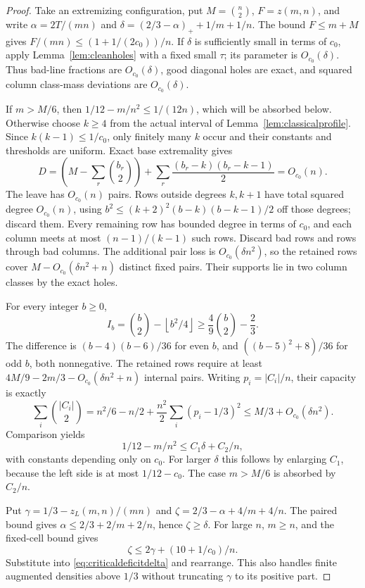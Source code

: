 \documentclass[11pt]{article}
\newcommand{\zl}{z_L}
\begin{document}
\begin{proof}
Take an extremizing configuration, put $M=\binom n2$, $F=z(m,n)$, and
write $\alpha=2T/(mn)$ and $\delta=(2/3-\alpha)_++1/m+1/n$.
The bound $F\le m+M$ gives
$F/(mn)\le(1+1/(2c_0))/n$. If $\delta$ is sufficiently small in terms
of $c_0$, apply Lemma~\ref{lem:cleanholes} with a fixed small $\tau$;
its parameter is $O_{c_0}(\delta)$. Thus bad-line fractions are
$O_{c_0}(\delta)$, good diagonal holes are exact, and squared column
class-mass deviations are $O_{c_0}(\delta)$.

If $m>M/6$, then $1/12-m/n^2\le1/(12n)$, which will be absorbed below.
Otherwise choose $k\ge4$ from the actual interval of
Lemma~\ref{lem:classicalprofile}. Since $k(k-1)\le1/c_0$, only finitely
many $k$ occur and their constants and thresholds are uniform. Exact
base extremality gives
\[
 D=\left(M-\sum_r\binom{b_r}{2}\right)
    +\sum_r\frac{(b_r-k)(b_r-k-1)}2=O_{c_0}(n).
\]
The leave has $O_{c_0}(n)$ pairs. Rows outside degrees $k,k+1$ have
total squared degree $O_{c_0}(n)$, using
$b^2\le(k+2)^2(b-k)(b-k-1)/2$ off those degrees; discard them.
Every remaining row has bounded degree in terms of $c_0$, and each
column meets at most $(n-1)/(k-1)$ such rows. Discard bad rows and
rows through bad columns. The additional pair loss is
$O_{c_0}(\delta n^2)$, so the retained rows cover
$M-O_{c_0}(\delta n^2+n)$ distinct fixed pairs. Their supports lie
in two column classes by the exact holes.

For every integer $b\ge0$,
\[
 I_b=\binom b2-\left\lfloor b^2/4\right\rfloor
 \ge\frac49\binom b2-\frac23.
\]
The difference is $(b-4)(b-6)/36$ for even $b$, and
$((b-5)^2+8)/36$ for odd $b$, both nonnegative.
The retained rows require at least
$4M/9-2m/3-O_{c_0}(\delta n^2+n)$ internal pairs. Writing
$p_i=|C_i|/n$, their capacity is exactly
\[
 \sum_i\binom{|C_i|}{2}
 =n^2/6-n/2+\frac{n^2}{2}\sum_i(p_i-1/3)^2
 \le M/3+O_{c_0}(\delta n^2).
\]
Comparison yields
\begin{equation}\label{eq:criticaldeficitdelta}
 1/12-m/n^2\le C_1\delta+C_2/n,
\end{equation}
with constants depending only on $c_0$. For larger $\delta$ this follows
by enlarging $C_1$, because the left side is at most $1/12-c_0$.
The case $m>M/6$ is absorbed by $C_2/n$.

Put $\gamma=1/3-\zl(m,n)/(mn)$ and
$\zeta=2/3-\alpha+4/m+4/n$. The paired bound gives
$\alpha\le2/3+2/m+2/n$, hence $\zeta\ge\delta$. For large $n$,
$m\ge n$, and the fixed-cell bound gives
\[
 \zeta\le2\gamma+(10+1/c_0)/n.
\]
Substitute into \eqref{eq:criticaldeficitdelta} and rearrange. This also
handles finite augmented densities above $1/3$ without truncating
$\gamma$ to its positive part.
\end{proof}
\end{document}
